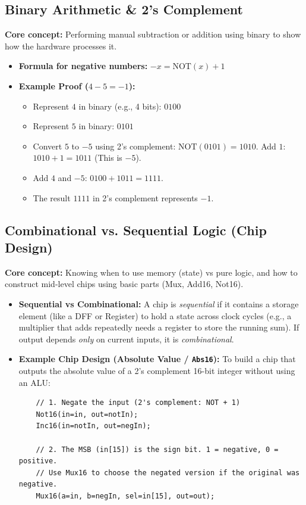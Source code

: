 \documentclass[12pt,a4paper]{article}
\begin{document}
\subsection{Binary Arithmetic \& 2's Complement}
\textbf{Core concept:} Performing manual subtraction or addition using binary to show how the hardware processes it.
\begin{itemize}
    \item \textbf{Formula for negative numbers:} $-x = \text{NOT}(x) + 1$
    \item \textbf{Example Proof ($4 - 5 = -1$):}
    \begin{itemize}
        \item Represent $4$ in binary (e.g., 4 bits): $0100$
        \item Represent $5$ in binary: $0101$
        \item Convert $5$ to $-5$ using 2's complement: $\text{NOT}(0101) = 1010$. Add $1$: $1010 + 1 = 1011$ (This is $-5$).
        \item Add $4$ and $-5$: $0100 + 1011 = 1111$.
        \item The result $1111$ in 2's complement represents $-1$.
    \end{itemize}
\end{itemize}

\subsection{Combinational vs. Sequential Logic (Chip Design)}
\textbf{Core concept:} Knowing when to use memory (state) vs pure logic, and how to construct mid-level chips using basic parts (Mux, Add16, Not16).
\begin{itemize}
    \item \textbf{Sequential vs Combinational:} A chip is \textit{sequential} if it contains a storage element (like a DFF or Register) to hold a state across clock cycles (e.g., a multiplier that adds repeatedly needs a register to store the running sum). If output depends \textit{only} on current inputs, it is \textit{combinational}.
    \item \textbf{Example Chip Design (Absolute Value / \texttt{Abs16}):} 
    To build a chip that outputs the absolute value of a 2's complement 16-bit integer without using an ALU:
    \begin{verbatim}
    // 1. Negate the input (2's complement: NOT + 1)
    Not16(in=in, out=notIn);
    Inc16(in=notIn, out=negIn);
    
    // 2. The MSB (in[15]) is the sign bit. 1 = negative, 0 = positive.
    // Use Mux16 to choose the negated version if the original was negative.
    Mux16(a=in, b=negIn, sel=in[15], out=out);
    \end{verbatim}
\end{itemize}
\end{document}
